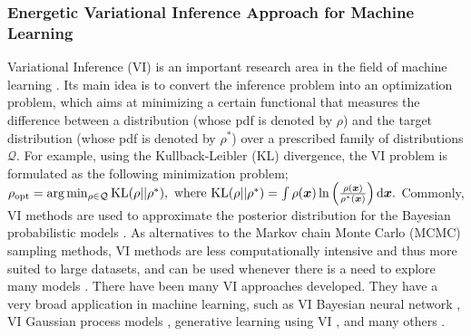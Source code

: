 \subsubsection{Energetic Variational Inference Approach for Machine Learning}
Variational Inference (VI) is an important research area in the field of machine learning \cite{jordan1999introduction, blei2017variational}.
Its main idea is to convert the inference problem into an optimization problem, which aims at minimizing a certain functional that measures the difference between a distribution (whose pdf is denoted by $\rho$) and the target distribution (whose pdf is denoted by $\rho^*$) over a prescribed family of distributions $\mathcal{Q}$.
For example, using the Kullback-Leibler (KL) divergence, the VI problem is formulated as the following minimization problem;
$
\rho_{\text{opt}} =\text{arg}\min_{\rho \in \mathcal{Q} }\mathrm{KL}(\rho||\rho^*), \text{ where } \mathrm{KL}( \rho ||\rho^*)  = \int \rho(\bm{x}) \ln \left( \frac{\rho(\bm{x})}{\rho^*(\bm{x} )} \right) \mathrm{d} \bm{x}.
$
Commonly, VI methods are used to approximate the posterior distribution for the Bayesian probabilistic models \cite{jordan1999introduction, neal1998view,  wainwright2008graphical, zhang2018advances}.
As alternatives to the Markov chain Monte Carlo (MCMC) sampling methods, VI methods are less computationally intensive and thus more suited to large datasets, and can be used whenever there is a need to explore many models \cite{blei2017variational}.
There have been many VI approaches developed. 
They have a very broad application in machine learning, such as VI Bayesian neural network
 \citep{grave2011practical,welling2017multiplicative, wu2019deterministic,shridhar2019comprehensive}, VI Gaussian process models \citep{king2006fast, nguyen2013efficient, nguyen2014automated, shetha2015sparse, damianou2016variational, cheng2017variational}, generative learning using VI \citep{kingma2013auto, rezende2014stochastic, goodfellow2014generative,nowozin2016f, hu2017unifying}, and many others \citep{kingma2014semi,mnih2016variational,hu2017unifying,tabak2010density}.

